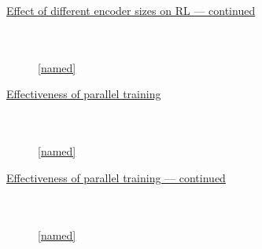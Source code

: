 \documentclass{beamer}
\begin{document}
\begin{frame}[plain]
		\centering
		\underline{Effect of different encoder sizes on RL --- continued}
		\vspace{-1cm}
\begin{figure}[!t]
  \captionsetup[subfloat]{position=top,labelformat=empty}
  \centering
    \subfloat[]{  \resizebox{0.4\textwidth}{!}{}}
    \subfloat[]{  \resizebox{0.4\textwidth}{!}{}}\\
  \vspace{-1cm}
    \subfloat[]{  \resizebox{0.4\textwidth}{!}{}}
    \\
    \ref{named}
\end{figure}
\end{frame}


\begin{frame}[plain]
		\centering
		\underline{Effectiveness of parallel training}
		\vspace{-1cm}
\begin{figure}[!t]
  \captionsetup[subfloat]{position=top,labelformat=empty}
  \centering
    \subfloat[]{  \resizebox{0.4\textwidth}{!}{}}
    \subfloat[]{  \resizebox{0.4\textwidth}{!}{}}\\
  \vspace{-1cm}
    \subfloat[]{  \resizebox{0.4\textwidth}{!}{}}
    \subfloat[]{  \resizebox{0.4\textwidth}{!}{}}\\
    \ref{named}
\end{figure}
\end{frame}


\begin{frame}[plain]
		\centering
		\underline{Effectiveness of parallel training --- continued}
		\vspace{-1cm}
\begin{figure}[!t]
  \captionsetup[subfloat]{position=top,labelformat=empty}
  \centering
    \subfloat[]{  \resizebox{0.4\textwidth}{!}{}}
    \subfloat[]{  \resizebox{0.4\textwidth}{!}{}}\\
  \vspace{-1cm}
    \subfloat[]{  \resizebox{0.4\textwidth}{!}{}}
  \\
    \ref{named}
\end{figure}
\end{frame}
\end{document}
